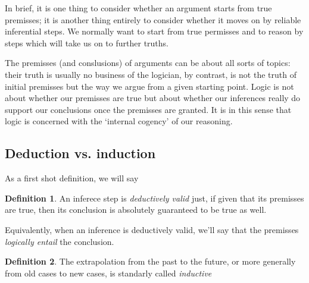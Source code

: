 \documentclass[12pt]{article}
\theoremstyle{definition}
\newtheorem{definition}{Definition}[section]
\begin{document}
    In brief, it is one thing to consider whether an argument starts from true premisses; it is another thing entirely to consider whether 
    it moves on by reliable inferential steps. We normally want to start from true permisses and to reason by steps which will take us on to further truths. \par 

    The premisses (and conslusions) of arguments can be about all sorts of topics: their truth is usually no business of the logician, by contrast, is not the truth 
    of initial premisses but the way we argue from a given starting point. Logic is not about whether our premisses are true but about whether our inferences really do 
    support our conclusions once the premisses are granted. It is in this sense that logic is concerned with the `internal cogency' of our reasoning.\par

    \subsection{Deduction vs. induction}
    As a first shot definition, we will say 

    \begin{definition}
        An inferece step is \textit{deductively valid} just, if given that its premisses are true, then its conclusion is absolutely 
        guaranteed to be true as well.
    \end{definition}

    Equivalently, when an inference is deductively valid, we'll say that the premisses \textit{logically entail} the conclusion.\par 

    \begin{definition}
        The extrapolation from the past to the future, or more generally from old cases to new cases, is standarly called \textit{inductive}
    \end{definition}
\end{document}

